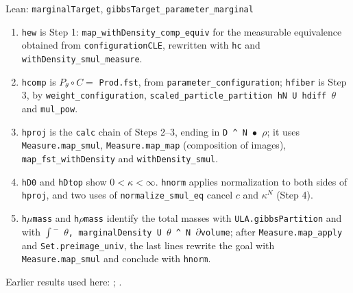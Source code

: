 \documentclass[11pt,a4paper]{report}
\begin{document}
\begin{leanbox}{Lean: \texttt{marginalTarget}, \texttt{gibbsTarget\_\allowbreak{}parameter\_\allowbreak{}marginal}}
\begin{enumerate}


\item \texttt{hew} is Step 1: \texttt{map\_\allowbreak{}with\allowbreak{}Density\_\allowbreak{}comp\_\allowbreak{}equiv} for the measurable equivalence obtained from \texttt{configuration\allowbreak{}CLE}, rewritten with \texttt{hc} and \texttt{with\allowbreak{}Density\_\allowbreak{}smul\_\allowbreak{}measure}.

\item \texttt{hcomp} is \(P_\theta\circ C=\) \texttt{Prod.\allowbreak{}fst}, from \texttt{parameter\_\allowbreak{}configuration}; \texttt{hfiber} is Step 3, by \texttt{weight\_\allowbreak{}configuration}, \texttt{scaled\_\allowbreak{}particle\_\allowbreak{}partition h\allowbreak{}N U hdiff \ensuremath{\theta}} and \texttt{mul\_\allowbreak{}pow}.

\item \texttt{hproj} is the \texttt{calc} chain of Steps 2–3, ending in \texttt{D \textasciicircum{} N \ensuremath{\bullet} \ensuremath{\rho}}; it uses \texttt{Measure.\allowbreak{}map\_\allowbreak{}smul}, \texttt{Measure.\allowbreak{}map\_\allowbreak{}map} (composition of images), \texttt{map\_\allowbreak{}fst\_\allowbreak{}with\allowbreak{}Density} and \texttt{with\allowbreak{}Density\_\allowbreak{}smul}.

\item \texttt{h\allowbreak{}D0} and \texttt{h\allowbreak{}Dtop} show \(0<\kappa<\infty\). \texttt{hnorm} applies normalization to both sides of \texttt{hproj}, and two uses of \texttt{normalize\_\allowbreak{}smul\_\allowbreak{}eq} cancel \(c\) and \(\kappa^N\) (Step 4).

\item \texttt{h\ensuremath{\mu}mass} and \texttt{h\ensuremath{\rho}mass} identify the total masses with \texttt{ULA.\allowbreak{}gibbs\allowbreak{}Partition} and with \texttt{\ensuremath{\int}\ensuremath{{}^{-}} \ensuremath{\theta}, marginal\allowbreak{}Density U \ensuremath{\theta} \textasciicircum{} N \ensuremath{\partial}volume}; after \texttt{Measure.\allowbreak{}map\_\allowbreak{}apply} and \texttt{Set.\allowbreak{}preimage\_\allowbreak{}univ}, the last lines rewrite the goal with \texttt{Measure.\allowbreak{}map\_\allowbreak{}smul} and conclude with \texttt{hnorm}.

\end{enumerate}
\end{leanbox}


Earlier results used here: \cite[Section~3.26.1]{LangevinLean2026ULASC}; \cite[Section~3.26.2]{LangevinLean2026ULASC}.
\end{document}

